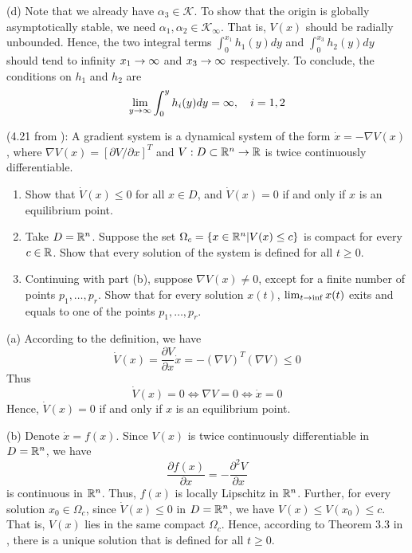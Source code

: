 \documentclass[a4 paper, 12pt]{article}
\begin{document}
(d) Note that we already have $\alpha_3 \in \mathcal{K}$. To show that the origin is globally asymptotically stable, we need $\alpha_1,\alpha_2 \in \mathcal{K}_{\infty}$. That is, $V(x)$ should be radially unbounded. Hence, the two integral terms $\int_0^{x_1}h_1(y)dy$ and $\int_0^{x_3}h_2(y)dy$ should tend to infinity $x_1\rightarrow\infty$ and $x_3\rightarrow\infty$ respectively. To conclude, the conditions on $h_1$ and $h_2$ are
\begin{equation}
        \lim_{y\rightarrow\infty}\int_0^yh_i(y)dy = \infty, \quad i=1,2
\end{equation}



\vspace{3em}
(4.21 from \cite{c1}): A gradient system is a dynamical system of the form $\dot{x} = -\nabla V(x)$, where $\nabla V(x) = [\partial{V}/\partial{x}]^T$ and $V: D \subset \mathbb{R}^n \rightarrow \mathbb{R}$ is twice continuously differentiable.
\begin{enumerate}[itemsep=1pt, parsep=1pt, label=(\alph*)]
        \item Show that $\dot{V}(x)\leq0$ for all $x \in D$, and $\dot{V}(x)=0$ if and only if $x$ is an equilibrium point.
        \item Take $D=\mathbb{R}^n$. Suppose the set $\Omega_c = \{x\in\mathbb{R}^n | V(x)\leq c\}$ is compact for every $c\in\mathbb{R}$. Show that every solution of the system is defined for all $t\geq0$.
        \item Continuing with part (b), suppose $\nabla V(x)\neq0$, except for a finite number of points $p_1,\dots,p_r$. Show that for every solution $x(t)$, $\lim_{t\rightarrow\inf}x(t)$ exits and equals to one of the points $p_1,\dots,p_r$.
\end{enumerate}

(a) According to the definition, we have 
\begin{equation}
        \dot{V}(x) = \frac{\partial{V}}{\partial{x}}\dot{x} = -(\nabla{V})^T(\nabla{V}) \leq 0
\end{equation}
Thus
\begin{equation}
        \dot{V}(x) = 0 \iff \nabla{V} = 0 \iff \dot{x}=0
\end{equation}
Hence, $\dot{V}(x)=0$ if and only if $x$ is an equilibrium point.

(b) Denote $\dot{x}=f(x)$. Since $V(x)$ is twice continuously differentiable in $D = \mathbb{R}^n$, we have 
\begin{equation}
        \frac{\partial{f(x)}}{\partial{x}} = -\frac{\partial^2V}{\partial{x}}
\end{equation}
is continuous in $\mathbb{R}^n$. Thus, $f(x)$ is locally Lipschitz in $\mathbb{R}^n$. Further, for every solution $x_0 \in \Omega_c$, since $\dot{V}(x)\leq0$ in $D=\mathbb{R}^n$, we have $V(x) \leq V(x_0) \leq c$. That is, $V(x)$ lies in the same compact $\Omega_c$. Hence, according to Theorem 3.3 in \cite{c1}, there is a unique solution that is defined for all $t\geq0$.
\end{document}
